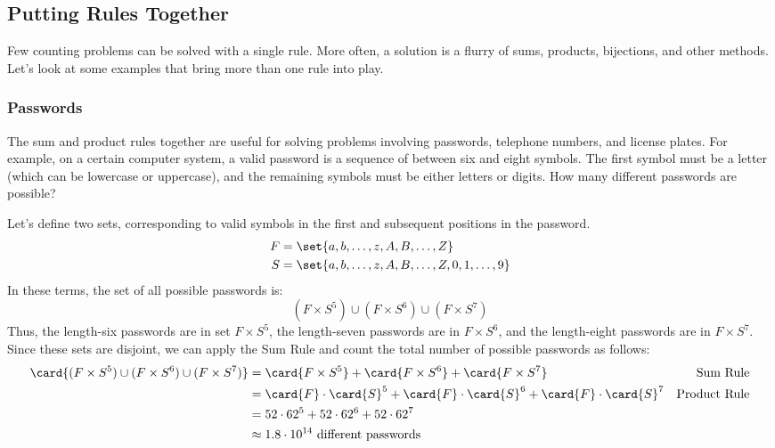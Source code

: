 \subsection{Putting Rules Together}

Few counting problems can be solved with a single rule.  More often, a
solution is a flurry of sums, products, bijections, and other methods.
Let's look at some examples that bring more than one rule into play.

\subsubsection*{Passwords}

The sum and product rules together are useful for solving problems
involving passwords, telephone numbers, and license plates.  For
example, on a certain computer system, a valid password is a sequence
of between six and eight symbols.  The first symbol must be a letter
(which can be lowercase or uppercase), and the remaining symbols must
be either letters or digits.  How many different passwords are
possible?

Let's define two sets, corresponding to valid symbols in the first and
subsequent positions in the password.
%
\begin{align*}
F & = \set{ a, b, \ldots, z, A, B, \ldots, Z } \\
S & = \set{ a, b, \ldots, z, A, B, \ldots, Z, 0, 1, \ldots, 9 }
\end{align*}
%
In these terms, the set of all possible passwords is:
%
\[
(F \times S^5) \cup (F \times S^6) \cup (F \times S^7)
\]
%
Thus, the length-six passwords are in set $F \times S^5$, the
length-seven passwords are in $F \times S^6$, and the length-eight
passwords are in $F \times S^7$.  Since these sets are disjoint, we
can apply the Sum Rule and count the total number of possible
passwords as follows:
%
\begin{align*}
\card{(F \times S^5) \cup (F \times S^6) \cup (F \times S^7)}
    & = \card{F \times S^5} + \card{F \times S^6} + \card{F \times S^7}
        & \text{Sum Rule} \\
    & = \card{F} \cdot \card{S}^5 +
          \card{F} \cdot \card{S}^6 +
          \card{F} \cdot \card{S}^7
        & \text{Product Rule} \\
    & = 52 \cdot 62^5 + 52 \cdot 62^6 + 52 \cdot 62^7 \\
    & \approx 1.8 \cdot 10^{14} \text{ different passwords}
\end{align*}


